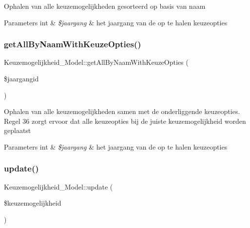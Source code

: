 Ophalen van alle keuzemogelijkheden gesorteerd op basis van naam 
\begin{DoxyParams}[1]{Parameters}
int & {\em \$jaargang} & het jaargang van de op te halen keuzeopties \\
\hline
\end{DoxyParams}
\mbox{\label{class_keuzemogelijkheid___model_ac8d5fc8e9e11684de17948fb985466c3}} 
\subsubsection{\texorpdfstring{get\+All\+By\+Naam\+With\+Keuze\+Opties()}{getAllByNaamWithKeuzeOpties()}}
{\footnotesize\ttfamily Keuzemogelijkheid\+\_\+\+Model\+::get\+All\+By\+Naam\+With\+Keuze\+Opties (\begin{DoxyParamCaption}\item[{}]{\$jaargangid }\end{DoxyParamCaption})}

Ophalen van alle keuzemogelijkheden samen met de onderliggende keuzeopties. Regel 36 zorgt ervoor dat alle keuzeopties bij de juiste keuzemogelijkheid worden geplaatst 
\begin{DoxyParams}[1]{Parameters}
int & {\em \$jaargang} & het jaargang van de op te halen keuzeopties \\
\hline
\end{DoxyParams}
\mbox{\label{class_keuzemogelijkheid___model_ab075f39b3a3ea0b4ee501c57ee9ca56c}} 
\subsubsection{\texorpdfstring{update()}{update()}}
{\footnotesize\ttfamily Keuzemogelijkheid\+\_\+\+Model\+::update (\begin{DoxyParamCaption}\item[{}]{\$keuzemogelijkheid }\end{DoxyParamCaption})}

